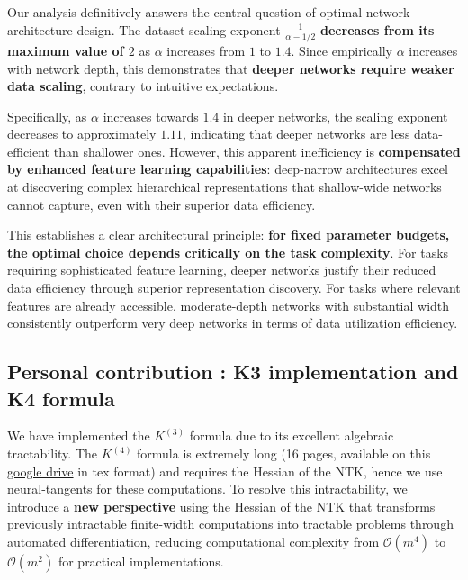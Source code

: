 \documentclass[a4paper]{article}
\theoremstyle{plain}
\theoremstyle{definition}
\theoremstyle{remark}
\begin{document}
\begin{tcolorbox}[colback=red!10,colframe=red!60!black,title={\textbf{🎯 ANSWER TO THE FUNDAMENTAL QUESTION: DEEPER VS WIDER}},enhanced,drop shadow]
    Our analysis definitively answers the central question of optimal network architecture design. The dataset scaling exponent $\frac{1}{\alpha - 1/2}$ \textbf{decreases from its maximum value of $2$} as $\alpha$ increases from $1$ to $1.4$. Since empirically $\alpha$ increases with network depth, this demonstrates that \textbf{deeper networks require weaker data scaling}, contrary to intuitive expectations. 
    
    Specifically, as $\alpha$ increases towards $1.4$ in deeper networks, the scaling exponent decreases to approximately $1.11$, indicating that deeper networks are less data-efficient than shallower ones. However, this apparent inefficiency is \textbf{compensated by enhanced feature learning capabilities}: deep-narrow architectures excel at discovering complex hierarchical representations that shallow-wide networks cannot capture, even with their superior data efficiency.
    
    This establishes a clear architectural principle: \textbf{for fixed parameter budgets, the optimal choice depends critically on the task complexity}. For tasks requiring sophisticated feature learning, deeper networks justify their reduced data efficiency through superior representation discovery. For tasks where relevant features are already accessible, moderate-depth networks with substantial width consistently outperform very deep networks in terms of data utilization efficiency.
\end{tcolorbox}















\subsection{Personal contribution : K3 implementation and K4 formula}
We have implemented the $K^{(3)}$ formula due to its excellent algebraic tractability. The $K^{(4)}$ formula is extremely long (16 pages, available on this \href{https://drive.google.com/file/d/1-00000000000000000000000000000000000000000}{google drive} in tex format) and requires the Hessian of the NTK, hence we use neural-tangents for these computations. 
To resolve this intractability, we introduce a \textbf{new perspective} using the Hessian of the NTK that transforms previously intractable finite-width computations into tractable problems through automated differentiation, reducing computational complexity from $\mathcal{O}(m^4)$ to $\mathcal{O}(m^2)$ for practical implementations.
\end{document}

